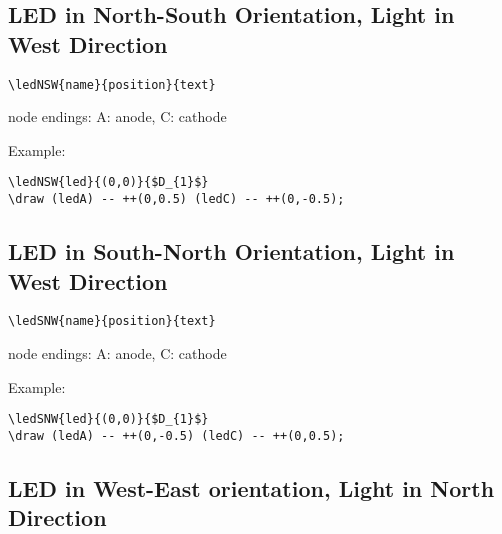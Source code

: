 \documentclass[parskip=full]{scrartcl}
\begin{document}
\subsection{LED in North-South Orientation, Light in West Direction}

\begin{verbatim}
\ledNSW{name}{position}{text}
\end{verbatim}
node endings: A: anode, C: cathode

Example:\\
\begin{minipage}{0.8\textwidth}
\begin{verbatim}
\ledNSW{led}{(0,0)}{$D_{1}$}
\draw (ledA) -- ++(0,0.5) (ledC) -- ++(0,-0.5);
\end{verbatim}
\end{minipage}
\begin{minipage}{0.19\textwidth}
\end{minipage}

\subsection{LED in South-North Orientation, Light in West Direction}

\begin{verbatim}
\ledSNW{name}{position}{text}
\end{verbatim}
node endings: A: anode, C: cathode

Example:\\
\begin{minipage}{0.8\textwidth}
\begin{verbatim}
\ledSNW{led}{(0,0)}{$D_{1}$}
\draw (ledA) -- ++(0,-0.5) (ledC) -- ++(0,0.5);
\end{verbatim}
\end{minipage}
\begin{minipage}{0.19\textwidth}
\end{minipage}

\subsection{LED in West-East orientation, Light in North Direction}
\end{document}
